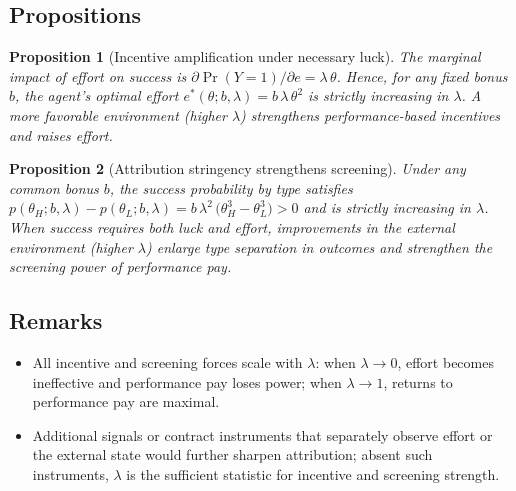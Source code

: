 \documentclass[11pt]{article}
\newtheorem{proposition}{Proposition}
\begin{document}
\subsection*{Propositions}
\begin{proposition}[Incentive amplification under necessary luck]
The marginal impact of effort on success is \(\partial\Pr(Y=1)/\partial e = \lambda\,\theta\). Hence, for any fixed bonus \(b\), the agent's optimal effort \(e^*(\theta;b,\lambda)=b\,\lambda\,\theta^2\) is strictly increasing in \(\lambda\). A more favorable environment (higher \(\lambda\)) strengthens performance-based incentives and raises effort.
\end{proposition}

\begin{proposition}[Attribution stringency strengthens screening]
Under any common bonus \(b\), the success probability by type satisfies \(p(\theta_H;b,\lambda)-p(\theta_L;b,\lambda)=b\,\lambda^2\,\big(\theta_H^3-\theta_L^3\big)>0\) and is strictly increasing in \(\lambda\). When success requires both luck and effort, improvements in the external environment (higher \(\lambda\)) enlarge type separation in outcomes and strengthen the screening power of performance pay.
\end{proposition}

\subsection*{Remarks}
\begin{itemize}
\item All incentive and screening forces scale with \(\lambda\): when \(\lambda\to 0\), effort becomes ineffective and performance pay loses power; when \(\lambda\to 1\), returns to performance pay are maximal.
\item Additional signals or contract instruments that separately observe effort or the external state would further sharpen attribution; absent such instruments, \(\lambda\) is the sufficient statistic for incentive and screening strength.
\end{itemize}
\end{document}

